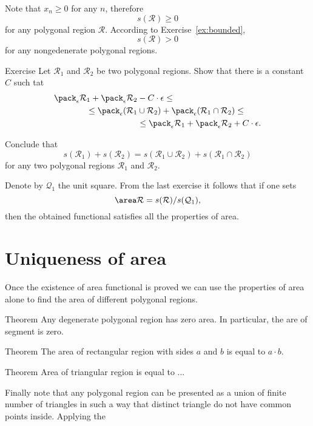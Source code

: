 Note that $x_n\ge 0$ for any $n$, therefore 
$$s(\mathcal R)\ge 0$$
for any polygonal region $\mathcal R$.
According to Exercise~\ref{ex:bounded},
$$s(\mathcal R)> 0$$
for any nongedenerate polygonal regions.


\begin{thm}{Exercise}
Let $\mathcal R_1$ and $\mathcal R_2$ be  two polygonal regions.
Show that there is a constant $C$ such tat
\begin{align*}
\pack_\epsilon \mathcal R_1 +\pack_\epsilon\mathcal R_2 &-C\cdot\epsilon\le
\\
\le
\pack_\epsilon (\mathcal R_1&\cup\mathcal R_2) +\pack_\epsilon (\mathcal R_1\cap\mathcal R_2)
\le 
\\
&\le
\pack_\epsilon \mathcal R_1 +\pack_\epsilon\mathcal R_2 +C\cdot\epsilon.
\end{align*}

Conclude that 
$$s(\mathcal{R}_1)+s (\mathcal{R}_2)=s(\mathcal{R}_1\cup\mathcal{R}_2)+s(\mathcal{R}_1\cap\mathcal{R}_2)$$
for any two polygonal regions $\mathcal R_1$ and $\mathcal R_2$.
\end{thm}

Denote by $\mathcal{Q}_1$ the unit square.
From the last exercise it follows that if one sets
$$\area\mathcal{R}=s(\mathcal{R})/s(\mathcal{Q}_1),$$
then the obtained functional satisfies all the properties of area.

\section*{Uniqueness of area}

Once the existence of area functional is proved we can use the properties of area alone to find the area of different polygonal regions.

\begin{thm}{Theorem}
Any degenerate polygonal region has zero area.
In particular, the are of segment is zero.
\end{thm}


\begin{thm}{Theorem}
The area of rectangular region with sides $a$ and $b$ is equal to $a\cdot b$. 
\end{thm}


\begin{thm}{Theorem}
Area of triangular region is equal to ...
\end{thm}

Finally note that any polygonal region can be presented as a union of finite number of triangles in such a way that distinct triangle do not have common points inside.
Applying the 

